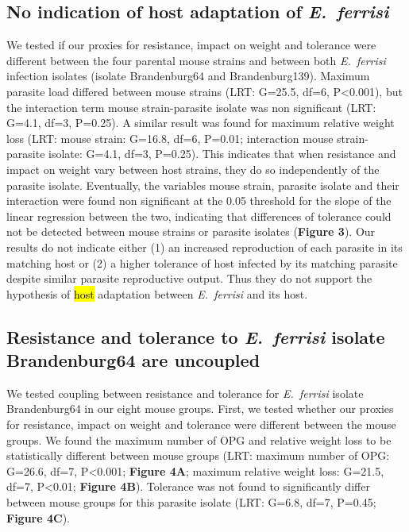 \documentclass[12pt]{article}
\begin{document}
\subsection{No indication of host adaptation of \textit{E.~ferrisi}}

We tested if our proxies for resistance, impact on weight and tolerance were different between the four parental mouse strains and between both \textit{E.~ferrisi} infection isolates (isolate Brandenburg64 and Brandenburg139). Maximum parasite load differed between mouse strains (LRT: G=25.5, df=6, P<0.001), but the interaction term mouse strain-parasite isolate was non significant (LRT: G=4.1, df=3, P=0.25). A similar result was found for maximum relative weight loss (LRT: mouse strain: G=16.8, df=6, P=0.01; interaction mouse strain-parasite isolate: G=4.1, df=3, P=0.25). This indicates that when resistance and impact on weight vary between host strains, they do so independently of the parasite isolate. Eventually, the variables mouse strain, parasite isolate and their interaction were found non significant at the 0.05 threshold for the slope of the linear regression between the two, indicating that differences of tolerance could not be detected between mouse strains or parasite isolates (\textbf{Figure 3}). Our results do not indicate either (1) an increased reproduction of each parasite in its matching host or (2) a higher tolerance of host infected by its matching parasite despite similar parasite reproductive output. Thus they do not support the hypothesis of \hl{host} adaptation between \textit{E.~ferrisi} and its host.

\subsection{Resistance and tolerance to \textit{E.~ferrisi }isolate Brandenburg64 are uncoupled}

We tested coupling between resistance and tolerance for \textit{E.~ferrisi} isolate Brandenburg64 in our eight mouse groups. First, we tested whether our proxies for resistance, impact on weight and tolerance were different between the mouse groups. We found the maximum number of OPG and relative weight loss to be statistically different between mouse groups (LRT: maximum number of OPG: G=26.6, df=7, P<0.001; \textbf{Figure 4A}; maximum relative weight loss: G=21.5, df=7, P<0.01; \textbf{Figure 4B}). Tolerance was not found to significantly differ between mouse groups for this parasite isolate (LRT: G=6.8, df=7, P=0.45; \textbf{Figure 4C}).\par
\end{document}
